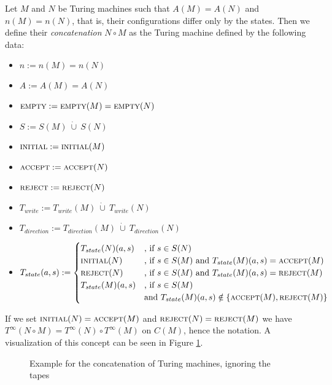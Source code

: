 \begin{Definition}
	Let $M$ and $N$ be Turing machines such that $A(M) = A(N)$ and $n(M) = n(N)$, that is, their configurations differ only by the states. Then we define their \emph{concatenation} $N \circ M$ as the Turing machine defined by the following data:
	\begin{itemize}
		\item{$n := n(M) = n(N)$}
		\item{$A := A(M) = A(N)$}
		\item{$\text{\scshape{empty}} := \text{\scshape{empty}}(M) = \text{\scshape{empty}}(N)$}
		\item{$S := S(M)~\dot\cup~S(N)$}
		\item{$\text{\scshape{initial}} := \text{\scshape{initial}}(M)$}
		\item{$\text{\scshape{accept}} := \text{\scshape{accept}}(N)$}
		\item{$\text{\scshape{reject}} := \text{\scshape{reject}}(N)$}
		\item{$T_{write} := T_{write}(M)~\dot\cup~T_{write}(N)$}
		\item{$T_{direction} := T_{direction}(M)~\dot\cup~T_{direction}(N)$}
		\item{$T_{state} (a,s) :=
			\begin{cases}
				T_{state}(N) (a,s) &\text{, if}~s \in S(N) \\
				\text{\scshape{initial}}(N) &\text{, if}~s \in S(M)~\text{and}~T_{state}(M)(a,s) = \text{\scshape{accept}}(M) \\
				\text{\scshape{reject}}(N) &\text{, if}~s \in S(M)~\text{and}~T_{state}(M)(a,s) = \text{\scshape{reject}}(M) \\
				T_{state}(M) (a,s) &\text{, if}~s \in S(M) \\&\text{and}~T_{state}(M)(a,s) \notin \{\text{\scshape{accept}}(M),\text{\scshape{reject}}(M)\}
			\end{cases}
		$}
	\end{itemize}
\end{Definition}
\begin{Remark}
	If we set $\text{\scshape{initial}}(N) = \text{\scshape{accept}}(M)$ and $\text{\scshape{reject}}(N) = \text{\scshape{reject}}(M)$ we have $T^\infty(N \circ M) = T^\infty(N) \circ T^\infty(M)$ on $C(M)$, hence the notation. A visualization of this concept can be seen in Figure \ref{turing_machines:basic_notions:fig_concatenation}.
\end{Remark}
\begin{figure}[h]
	\centering
	
	\caption{Example for the concatenation of Turing machines, ignoring the tapes}
	\label{turing_machines:basic_notions:fig_concatenation}
\end{figure}
